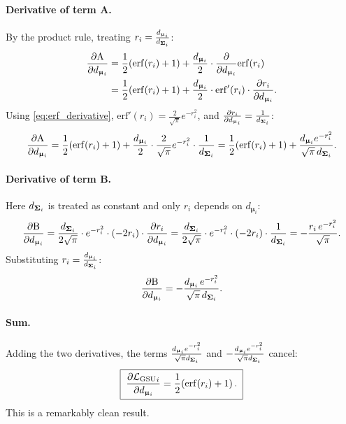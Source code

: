\documentclass[11pt, letterpaper]{article}
\newcommand{\bSigma}{\vb{\Sigma}}
\newcommand{\bmu}{\boldsymbol{\upmu}}
\newcommand{\loss}{\mathcal{L}}
\begin{document}
\paragraph{Derivative of term A.} By the product rule, treating $r_i = \frac{d_{\bmu_i}}{d_{\bSigma_i}}$:
\begin{align}
    \pdv{\text{A}}{d_{\bmu_i}} &= \frac{1}{2}(\mathrm{erf}(r_i) + 1) + \frac{d_{\bmu_i}}{2} \cdot \pdv{d_{\bmu_i}}\mathrm{erf}(r_i) \notag \\
    &= \frac{1}{2}(\mathrm{erf}(r_i) + 1) + \frac{d_{\bmu_i}}{2} \cdot \mathrm{erf}'(r_i) \cdot \pdv{r_i}{d_{\bmu_i}}.
\end{align}
Using \cref{eq:erf_derivative}, $\mathrm{erf}'(r_i) = \frac{2}{\sqrt{\pi}}e^{-r_i^2}$, and $\pdv{r_i}{d_{\bmu_i}} = \frac{1}{d_{\bSigma_i}}$:
\begin{equation}
    \pdv{\text{A}}{d_{\bmu_i}} = \frac{1}{2}(\mathrm{erf}(r_i) + 1) + \frac{d_{\bmu_i}}{2} \cdot \frac{2}{\sqrt{\pi}}e^{-r_i^2} \cdot \frac{1}{d_{\bSigma_i}} = \frac{1}{2}(\mathrm{erf}(r_i) + 1) + \frac{d_{\bmu_i} e^{-r_i^2}}{\sqrt{\pi}\, d_{\bSigma_i}}.
\end{equation}

\paragraph{Derivative of term B.} Here $d_{\bSigma_i}$ is treated as constant and only $r_i$ depends on $d_{\bmu_i}$:
\begin{equation}
    \pdv{\text{B}}{d_{\bmu_i}} = \frac{d_{\bSigma_i}}{2\sqrt{\pi}} \cdot e^{-r_i^2} \cdot (-2r_i) \cdot \pdv{r_i}{d_{\bmu_i}} = \frac{d_{\bSigma_i}}{2\sqrt{\pi}}\cdot e^{-r_i^2}\cdot(-2r_i)\cdot\frac{1}{d_{\bSigma_i}} = -\frac{r_i\, e^{-r_i^2}}{\sqrt{\pi}}.
\end{equation}
Substituting $r_i = \frac{d_{\bmu_i}}{d_{\bSigma_i}}$:
\begin{equation}
    \pdv{\text{B}}{d_{\bmu_i}} = -\frac{d_{\bmu_i}\, e^{-r_i^2}}{\sqrt{\pi}\, d_{\bSigma_i}}.
\end{equation}

\paragraph{Sum.} Adding the two derivatives, the terms $\frac{d_{\bmu_i}e^{-r_i^2}}{\sqrt{\pi}d_{\bSigma_i}}$ and $-\frac{d_{\bmu_i}e^{-r_i^2}}{\sqrt{\pi}d_{\bSigma_i}}$ cancel:
\begin{equation}\label{eq:dL_ddmu}
    \boxed{\;\pdv{{\loss_{\text{GSU}}}_{i}}{d_{\bmu_i}} = \frac{1}{2}\!\left(\mathrm{erf}(r_i) + 1\right).\;}
\end{equation}
This is a remarkably clean result.
\end{document}
